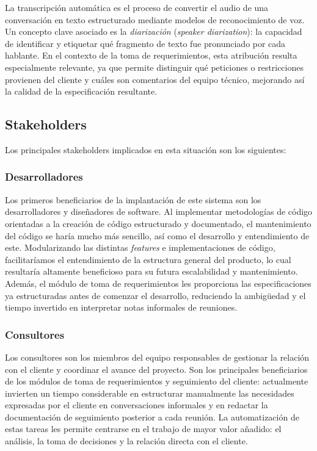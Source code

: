 \documentclass[11pt, letterpaper]{article}
\begin{document}
La transcripción automática es el proceso de convertir el audio de una conversación en texto estructurado mediante modelos de reconocimiento de voz. Un concepto clave asociado es la \textit{diarización} (\textit{speaker diarization}): la capacidad de identificar y etiquetar qué fragmento de texto fue pronunciado por cada hablante. En el contexto de la toma de requerimientos, esta atribución resulta especialmente relevante, ya que permite distinguir qué peticiones o restricciones provienen del cliente y cuáles son comentarios del equipo técnico, mejorando así la calidad de la especificación resultante. \cite{radford2022whisper}

\subsection{Stakeholders}
\label{sec:stakeholders}

Los principales stakeholders implicados en esta situación son los siguientes:

\subsubsection{Desarrolladores}
\label{sec:desarrolladores}

Los primeros beneficiarios de la implantación de este sistema son los desarrolladores y diseñadores de software. Al implementar metodologías de código orientadas a la creación de código estructurado y documentado, el mantenimiento del código se haría mucho más sencillo, así como el desarrollo y entendimiento de este. Modularizando las distintas \textit{features} e implementaciones de código, facilitaríamos el entendimiento de la estructura general del producto, lo cual resultaría altamente beneficioso para su futura escalabilidad y mantenimiento. Además, el módulo de toma de requerimientos les proporciona las especificaciones ya estructuradas antes de comenzar el desarrollo, reduciendo la ambigüedad y el tiempo invertido en interpretar notas informales de reuniones.

\subsubsection{Consultores}
\label{sec:consultores}

Los consultores son los miembros del equipo responsables de gestionar la relación con el cliente y coordinar el avance del proyecto. Son los principales beneficiarios de los módulos de toma de requerimientos y seguimiento del cliente: actualmente invierten un tiempo considerable en estructurar manualmente las necesidades expresadas por el cliente en conversaciones informales y en redactar la documentación de seguimiento posterior a cada reunión. La automatización de estas tareas les permite centrarse en el trabajo de mayor valor añadido: el análisis, la toma de decisiones y la relación directa con el cliente.
\end{document}
